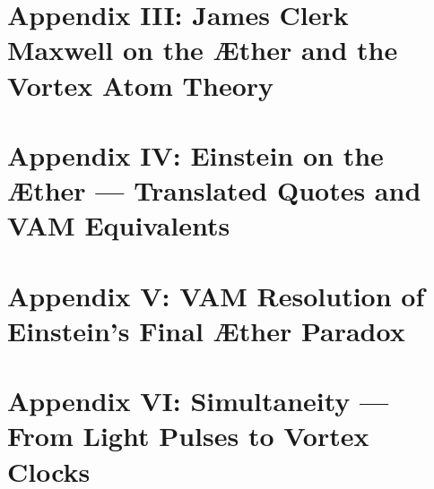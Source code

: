 \documentclass[preprint,titlepage]{revtex4-2}
\begin{document}
        \section*{Appendix III: James Clerk Maxwell on the Æther and the Vortex Atom Theory}
            \label{appendix:maxwell}
            

        \section*{Appendix IV: Einstein on the Æther — Translated Quotes and VAM Equivalents}
            \label{appendix:einstein}
            

        \section*{Appendix V: VAM Resolution of Einstein’s Final Æther Paradox}
            \label{appendix:final-aether}
            

        \section{Appendix VI: Simultaneity — From Light Pulses to Vortex Clocks}
            \label{appendix:Simultaneity}
            
\end{document}

